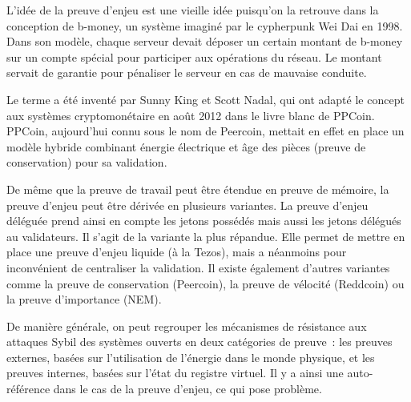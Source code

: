 
L'idée de la preuve d'enjeu est une vieille idée puisqu'on la retrouve dans la conception de b-money, un système imaginé par le cypherpunk Wei Dai en 1998. Dans son modèle, chaque serveur devait déposer un certain montant de b-money sur un compte spécial pour participer aux opérations du réseau. Le montant servait de garantie pour pénaliser le serveur en cas de mauvaise conduite.

Le terme  a été inventé par Sunny King et Scott Nadal, qui ont adapté le concept aux systèmes cryptomonétaire en août 2012 dans le livre blanc de PPCoin. PPCoin, aujourd'hui connu sous le nom de Peercoin, mettait en effet en place un modèle hybride combinant énergie électrique et âge des pièces (preuve de conservation) pour sa validation.

De même que la preuve de travail peut être étendue en preuve de mémoire, la preuve d'enjeu peut être dérivée en plusieurs variantes. La preuve d'enjeu déléguée prend ainsi en compte les jetons possédés mais aussi les jetons délégués au validateurs. Il s'agit de la variante la plus répandue. Elle permet de mettre en place une preuve d'enjeu liquide (à la Tezos), mais a néanmoins pour inconvénient de centraliser la validation. Il existe également d'autres variantes comme la preuve de conservation (Peercoin), la preuve de vélocité (Reddcoin) ou la preuve d'importance (NEM).

De manière générale, on peut regrouper les mécanismes de résistance aux attaques Sybil des systèmes ouverts en deux catégories de preuve~: les preuves externes, basées sur l'utilisation de l'énergie dans le monde physique, et les preuves internes, basées sur l'état du registre virtuel. Il y a ainsi une auto-référence dans le cas de la preuve d'enjeu, ce qui pose problème.

